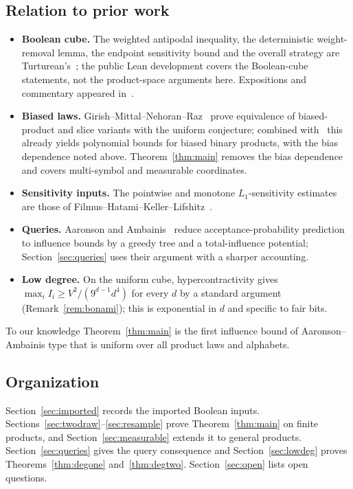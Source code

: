 \documentclass[11pt]{article}
\numberwithin{equation}{section}
\theoremstyle{plain}
\theoremstyle{remark}
\begin{document}
\subsection{Relation to prior work}\label{sec:prior}
\begin{itemize}[leftmargin=*,itemsep=2pt]
\item \textbf{Boolean cube.} The weighted antipodal inequality, the deterministic weight-removal lemma, the endpoint sensitivity bound and the overall strategy are Turturean's~\cite{Tur26}; the public Lean development covers the Boolean-cube statements, not the product-space arguments here. Expositions and commentary appeared in~\cite{BDST26,Aar26}.
\item \textbf{Biased laws.} Girish--Mittal--Nehoran--Raz~\cite{GMNR26} prove equivalence of biased-product and slice variants with the uniform conjecture; combined with~\cite{Tur26} this already yields polynomial bounds for biased binary products, with the bias dependence noted above. Theorem~\ref{thm:main} removes the bias dependence and covers multi-symbol and measurable coordinates.
\item \textbf{Sensitivity inputs.} The pointwise and monotone $L_1$-sensitivity estimates are those of Filmus--Hatami--Keller--Lifshitz~\cite{FHKL16}.
\item \textbf{Queries.} Aaronson and Ambainis~\cite{AA14} reduce acceptance-probability prediction to influence bounds by a greedy tree and a total-influence potential; Section~\ref{sec:queries} uses their argument with a sharper accounting.
\item \textbf{Low degree.} On the uniform cube, hypercontractivity gives $\max_iI_i\ge V^2/(9^{d-1}d^4)$ for every $d$ by a standard argument (Remark~\ref{rem:bonami}); this is exponential in $d$ and specific to fair bits.
\end{itemize}
To our knowledge Theorem~\ref{thm:main} is the first influence bound of Aaronson--Ambainis type that is uniform over all product laws and alphabets.

\subsection{Organization}
Section~\ref{sec:imported} records the imported Boolean inputs. Sections~\ref{sec:twodraw}--\ref{sec:resample} prove Theorem~\ref{thm:main} on finite products, and Section~\ref{sec:measurable} extends it to general products. Section~\ref{sec:queries} gives the query consequence and Section~\ref{sec:lowdeg} proves Theorems~\ref{thm:degone} and~\ref{thm:degtwo}. Section~\ref{sec:open} lists open questions.
\end{document}
